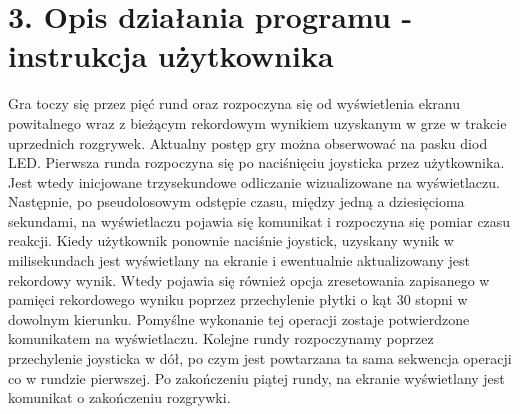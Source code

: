 \documentclass[a4paper,12pt]{report}
\begin{document}
\section*{3. Opis działania programu - instrukcja użytkownika}
Gra toczy się przez pięć rund oraz rozpoczyna się od wyświetlenia ekranu powitalnego wraz z bieżącym rekordowym wynikiem uzyskanym w grze w trakcie uprzednich rozgrywek. Aktualny postęp gry można obserwować na pasku diod LED. Pierwsza runda rozpoczyna się po naciśnięciu joysticka przez użytkownika. Jest wtedy inicjowane trzysekundowe odliczanie wizualizowane na wyświetlaczu. Następnie, po pseudolosowym odstępie czasu, między jedną a dziesięcioma sekundami, na wyświetlaczu pojawia się komunikat i rozpoczyna się pomiar czasu reakcji. Kiedy użytkownik ponownie naciśnie joystick, uzyskany wynik w milisekundach jest wyświetlany na ekranie i ewentualnie aktualizowany jest rekordowy wynik. Wtedy pojawia się również opcja zresetowania zapisanego w pamięci rekordowego wyniku poprzez przechylenie płytki o kąt 30 stopni w dowolnym kierunku. Pomyślne wykonanie tej operacji zostaje potwierdzone komunikatem na wyświetlaczu. Kolejne rundy rozpoczynamy poprzez przechylenie joysticka w dół, po czym jest powtarzana ta sama sekwencja operacji co w rundzie pierwszej. Po zakończeniu piątej rundy, na ekranie wyświetlany jest komunikat o zakończeniu rozgrywki.
\end{document}
